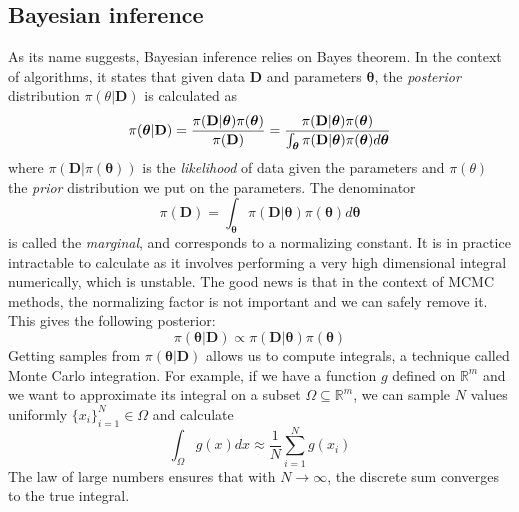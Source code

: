 \documentclass[12pt]{memoir}
\newcommand{\mb}{\mathbf}
\newcommand{\tb}{\textbf}
\newcommand{\ti}{\textit}
\begin{document}
\subsection{Bayesian inference}\label{section:background:mcmc:bayesian-inference}
As its name suggests, Bayesian inference relies on Bayes theorem. In the context of algorithms, it states that given data $\mb{D}$ and parameters $\boldsymbol{\theta}$, the \textit{posterior} distribution $\pi(\theta|\mb{D})$ is calculated as 
\begin{equation} \label{eq:posterior-with-marginal}
    \pi(\boldsymbol{\theta}|\mb{D}) = \frac{\pi(\mb{D}|\boldsymbol{\theta})\pi(\boldsymbol{\theta})}{\pi(\tb D)} = \frac{\pi(\mb{D}|\boldsymbol{\theta})\pi(\boldsymbol{\theta})}{\int_{\boldsymbol{\theta}} \pi(\mb{D}|\boldsymbol{\theta}) \pi(\boldsymbol{\theta})d\boldsymbol{\theta}}
\end{equation}
where $\pi(\mb{D}|\pi(\boldsymbol{\theta}))$ is the \ti{likelihood} of data given the parameters and $\pi(\theta)$ the \ti{prior} distribution we put on the parameters. The denominator
\begin{equation}
    \pi(\mb{D}) = {\int_{\boldsymbol{\theta}} \pi(\mb{D}|\boldsymbol{\theta}) \pi(\boldsymbol{\theta})d\boldsymbol{\theta}}
\end{equation} 
is called the \ti{marginal}, and corresponds to a normalizing constant. It is in practice intractable to calculate as it involves performing a very high dimensional integral numerically, which is unstable. The good news is that in the context of MCMC methods, the normalizing factor is not important and we can safely remove it. This gives the following posterior:
\begin{equation} \label{eq:posterior-without-marginal}
    \pi(\boldsymbol{\theta}|\mb{D}) \propto {\pi(\mb{D}|\boldsymbol{\theta}) \pi(\boldsymbol{\theta})}
\end{equation}
Getting samples from $\pi(\boldsymbol{\theta}|\mb{D})$ allows us to compute integrals, a technique called Monte Carlo integration. For example, if we have a function $g$ defined on $\mathbb{R}^m$ and we want to approximate its integral on a subset $\Omega \subseteq \mathbb R^m$, we can sample $N$ values uniformly $\{x_i\}_{i=1}^N \in \Omega$ and calculate 
\begin{equation}
    \int_\Omega g(x) dx \approx \frac{1}{N} \sum_{i=1}^{N} g(x_i)
\end{equation}
The law of large numbers ensures that with $N \rightarrow \infty$, the discrete sum converges to the true integral.\cite{wiki:monte-carlo-integration}\medbreak
\end{document}
